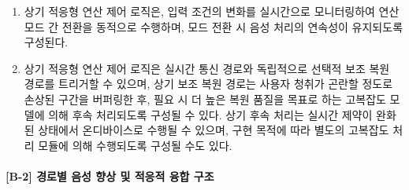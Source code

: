 \documentclass{article}
\DeclareRobustCommand{\codexedit}[1]{\textcolor{customorange}{#1}}
\DeclareRobustCommand{\vtwoedit}[1]{\textcolor{customgreen}{#1}}
\begin{document}
\begin{enumerate}[label = \textbf{(B.1.\arabic*)}]
    상기 외부 소음도는 공기전도 마이크로폰 채널의 단시간 RMS 또는 등가 음압 레벨(Leq)에 기초하여 산출될 수 있으며, 공기전도 채널 포화 시에는 포화 마스크 활성 비율 또는 별도 음압 센서의 측정값을 보조 지표로 활용할 수 있다. 또한, 제0 모드 선택을 위해 스펙트럼 변동량(spectral flux), 프레임 간 분산, 임펄시브니스(impulsiveness), 및 DSP 처리 후 잔여 오차에 대응하는 품질 지표와 같은 저복잡도 특성량이 추가로 사용될 수 있다.

    상기 모드 전환에는 채터링 방지를 위한 히스테리시스가 적용되며, 일 실시예에서 제2 모드에서 제1 모드로의 복귀 시 외부 소음도 기준을 110\,dB\,SPL 미만, 포화 마스크 활성 비율을 5\% 미만으로 설정한다. 상기 각 임계값은 운용 환경에 따라 조정 가능한 설계 파라미터이며, 구체적인 상태 전이 조건 및 전환 절차는 후술하는 적응형 연산 제어 실시예에서 상세히 기술한다.

    \item 상기 적응형 연산 제어 로직은, 입력 조건의 변화를 실시간으로
    모니터링하여 연산 모드 간 전환을 동적으로 수행하며, 모드 전환 시
    음성 처리의 연속성이 유지되도록 구성된다.

    \item \codexedit{상기 적응형 연산 제어 로직은 실시간 통신 경로와 독립적으로 선택적 보조 복원 경로를 트리거할 수 있으며, 상기 보조 복원 경로는 사용자 청취가 곤란할 정도로 손상된 구간을 버퍼링한 후, 필요 시 더 높은 복원 품질을 목표로 하는 고복잡도 모델에 의해 후속 처리되도록 구성될 수 있다. \vtwoedit{상기 후속 처리는 실시간 제약이 완화된 상태에서 온디바이스로 수행될 수 있으며, 구현 목적에 따라 별도의 고복잡도 처리 모듈에 의해 수행되도록 구성될 수도 있다.}}

\end{enumerate}


\paragraph{[B-2] 경로별 음성 향상 및 적응적 융합 구조}
\end{document}

